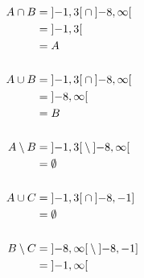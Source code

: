 \documentclass{article}
\begin{document}
\begin{align*}
  A \cap B &= \interval[open]{-1}{3} \cap \interval[open]{-8}{\infty} \\
           &= \interval[open]{-1}{3} \\
           &= A \\
  \\
  A \cup B &= \interval[open]{-1}{3} \cap \interval[open]{-8}{\infty} \\
           &= \interval[open]{-8}{\infty} \\
           &= B \\
  \\
  A \setminus B &= \interval[open]{-1}{3} \setminus \interval[open]{-8}{\infty} \\
           &= \emptyset \\
  \\
  A \cup C &= \interval[open]{-1}{3} \cap \interval[open left]{-8}{-1} \\
           &= \emptyset \\
  \\
  B \setminus C &= \interval[open]{-8}{\infty} \setminus \interval[open left]{-8}{-1} \\
           &= \interval[open]{-1}{\infty} \\
\end{align*}
\end{document}
